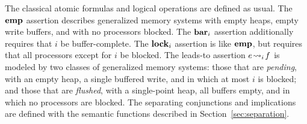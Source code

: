 \documentclass[11pt]{report}
\begin{document}
The classical atomic formulas and logical operations are defined as usual. The $\mathbf{emp}$ assertion describes generalized memory systems with empty heaps, empty write buffers, and with no processors blocked. The $\mathbf{bar}_{i}$ assertion additionally requires that $i$ be buffer-complete. The $\mathbf{lock}_{i}$ assertion is like $\mathbf{emp}$, but requires that all processors except for $i$ be blocked. The leads-to assertion $e \!\leadsto_{i}\! f$ is modeled by two classes of generalized memory systems: those that are \emph{pending}, with an empty heap, a single buffered write, and in which at most $i$ is blocked; and those that are \emph{flushed}, with a single-point heap, all buffers empty, and in which no processors are blocked. The separating conjunctions and implications are defined with the semantic functions described in Section~\ref{sec:separation}.  
\end{document}
